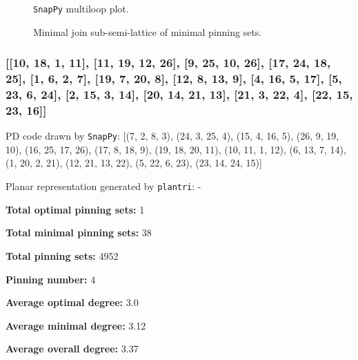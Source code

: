 \documentclass{article}%
\begin{document}
\begin{multicols}{2}
\begin{figure}[H]
\centering

\caption{\texttt{SnapPy} multiloop plot.}
\label{fig:tex/img/[[14, 22, 1, 15], [15, 7, 16, 8], [8, 13, 9, 14], [9, 21, 10, 22], [1, 10, 2, 11], [11, 6, 12, 7], [16, 12, 17, 13], [20, 26, 21, 23], [2, 26, 3, 25], [5, 17, 6, 18], [23, 5, 24, 4], [19, 3, 20, 4], [.svg}
\end{figure}
\columnbreak

\begin{figure}[H]
\centering
\scalebox{0.8}{}
\caption{Minimal join sub-semi-lattice of minimal pinning sets.}
\label{fig:tex/img/[[14, 22, 1, 15], [15, 7, 16, 8], [8, 13, 9, 14], [9, 21, 10, 22], [1, 10, 2, 11], [11, 6, 12, 7], [16, 12, 17, 13], [20, 26, 21, 23], [2, 26, 3, 25], [5, 17, 6, 18], [23, 5, 24, 4], [19, 3, 20, 4], [.pgf}
\end{figure}
\end{multicols}

\newpage

\subsubsection{[[10, 18, 1, 11], [11, 19, 12, 26], [9, 25, 10, 26], [17, 24, 18, 25], [1, 6, 2, 7], [19, 7, 20, 8], [12, 8, 13, 9], [4, 16, 5, 17], [5, 23, 6, 24], [2, 15, 3, 14], [20, 14, 21, 13], [21, 3, 22, 4], [22, 15, 23, 16]]}

{\small\noindent PD code drawn by \texttt{SnapPy}: [(7, 2, 8, 3), (24, 3, 25, 4), (15, 4, 16, 5), (26, 9, 19, 10), (16, 25, 17, 26), (17, 8, 18, 9), (19, 18, 20, 11), (10, 11, 1, 12), (6, 13, 7, 14), (1, 20, 2, 21), (12, 21, 13, 22), (5, 22, 6, 23), (23, 14, 24, 15)]}

{\small\noindent Planar representation generated by \texttt{plantri}: -}

\begin{multicols}{2}
{\normalsize \noindent\textbf{Total optimal pinning sets:} 1

\noindent\textbf{Total minimal pinning sets:} 38

\noindent\textbf{Total pinning sets:} 4952

\noindent\textbf{Pinning number:} 4

}
\columnbreak

{\normalsize \noindent\textbf{Average optimal degree:} 3.0

\noindent\textbf{Average minimal degree:} 3.12

\noindent\textbf{Average overall degree:} 3.37

}
\end{multicols}
\end{document}
